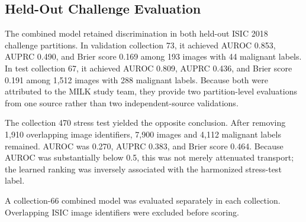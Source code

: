 \documentclass[11pt]{article}
\begin{document}
\subsection{Held-Out Challenge Evaluation}
The combined model retained discrimination in both held-out ISIC 2018 challenge partitions. In validation collection 73, it achieved AUROC 0.853, AUPRC 0.490, and Brier score 0.169 among 193 images with 44 malignant labels. In test collection 67, it achieved AUROC 0.809, AUPRC 0.436, and Brier score 0.191 among 1,512 images with 288 malignant labels. Because both were attributed to the MILK study team, they provide two partition-level evaluations from one source rather than two independent-source validations.

The collection 470 stress test yielded the opposite conclusion. After removing 1,910 overlapping image identifiers, 7,900 images and 4,112 malignant labels remained. AUROC was 0.270, AUPRC 0.383, and Brier score 0.464. Because AUROC was substantially below 0.5, this was not merely attenuated transport; the learned ranking was inversely associated with the harmonized stress-test label.

\begin{table}[H]
\centering
\caption{Held-out challenge evaluation and dataset-shift stress test of the combined model.}
\label{tab:external}
\begin{threeparttable}
\scriptsize
{}
\begin{tablenotes}[flushleft]\footnotesize
\item A collection-66 combined model was evaluated separately in each collection. Overlapping ISIC image identifiers were excluded before scoring.
\end{tablenotes}
\end{threeparttable}
\end{table}
\end{document}
